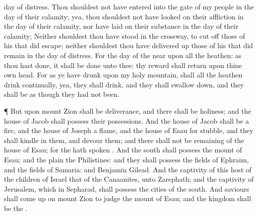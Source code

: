 {day of
distress.
Thou shouldest not have
entered into the
gate of my
people in the
day of their
calamity; yea, thou shouldest not have
looked on their
affliction in the
day of their
calamity, nor have
laid
{} on their
substance in the
day of their
calamity;
Neither shouldest thou have
stood in the
crossway, to cut
off those of his that did
escape; neither shouldest thou have delivered
up those of his that did
remain in the
day of
distress.
For the
day of the
{}
{}
near upon all the
heathen: as thou hast
done, it shall be
done unto thee: thy
reward shall
return upon thine own
head.
For as ye have
drunk upon my
holy
mountain,
{} shall all the
heathen
drink
continually, yea, they shall
drink, and they shall swallow
down, and they shall be as though they had
not been.
\par }{\PP {}¶ But upon
mount
Zion shall be
deliverance, and there shall be
holiness; and the
house of
Jacob shall
possess their
possessions.
And the
house of
Jacob shall be a
fire, and the
house of
Joseph a
flame, and the
house of
Esau for
stubble, and they shall
kindle in them, and
devour them; and there shall not be
{}
remaining of the
house of
Esau; for the
{} hath
spoken
{}.
And
{} the
south shall
possess the
mount of
Esau; and
{} the
plain the
Philistines: and they shall
possess the
fields of
Ephraim, and the
fields of
Samaria: and
Benjamin
{}
Gilead.
And the
captivity of this
host of the
children of
Israel
{} that of the
Canaanites,
{} unto
Zarephath; and the
captivity of
Jerusalem, which
{} in
Sepharad, shall
possess the
cities of the
south.
And
saviours shall come
up on
mount
Zion to
judge the
mount of
Esau; and the
kingdom shall be the
{}.
\par }